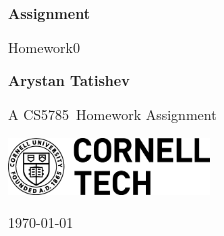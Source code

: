 \documentclass[10pt, a4paper]{article}
\newcommand\course{CS5785}                            %
\newcommand\hwnumber{0}                                 %
\newcommand\Information{Arystan Tatishev}                        %
\begin{document}
\begin{titlepage}
    \begin{center}
        \vspace*{3cm}
            
        \Huge
        \textbf{Assignment}
            
        \vspace{1cm}
        \huge
        Homework\hwnumber
            
        \vspace{1.5cm}
        \Large
            
        \textbf{\Information}                      %
        
            
        \vfill
        
        A \course \ Homework Assignment
            
        \vspace{1cm}
            
        \includegraphics[width=0.4\textwidth]{logo-ct.png}
        \\
        
        \Large
        
        \today
            
    \end{center}
\end{titlepage}

\newpage
\end{document}
